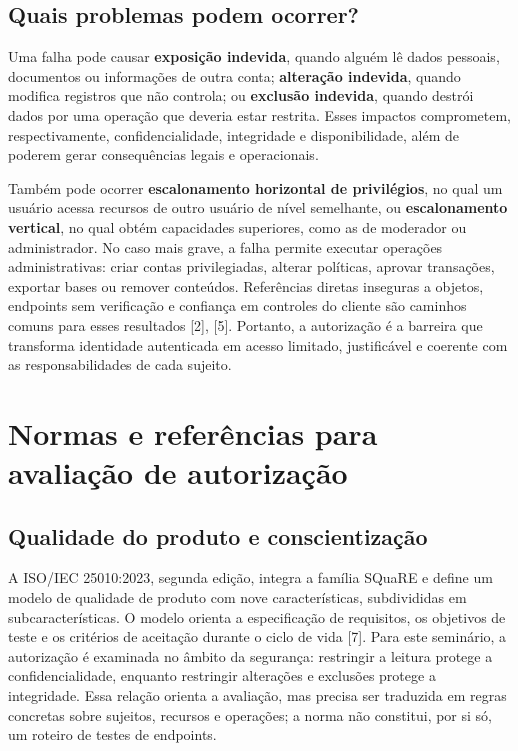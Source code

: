 \subsection{Quais problemas podem
ocorrer?}\label{quais-problemas-podem-ocorrer}

Uma falha pode causar \textbf{exposição indevida}, quando alguém lê
dados pessoais, documentos ou informações de outra conta;
\textbf{alteração indevida}, quando modifica registros que não controla;
ou \textbf{exclusão indevida}, quando destrói dados por uma operação que
deveria estar restrita. Esses impactos comprometem, respectivamente,
confidencialidade, integridade e disponibilidade, além de poderem gerar
consequências legais e operacionais.

Também pode ocorrer \textbf{escalonamento horizontal de privilégios}, no
qual um usuário acessa recursos de outro usuário de nível semelhante, ou
\textbf{escalonamento vertical}, no qual obtém capacidades superiores,
como as de moderador ou administrador. No caso mais grave, a falha
permite executar operações administrativas: criar contas privilegiadas,
alterar políticas, aprovar transações, exportar bases ou remover
conteúdos. Referências diretas inseguras a objetos, endpoints sem
verificação e confiança em controles do cliente são caminhos comuns para
esses resultados {[}2{]}, {[}5{]}. Portanto, a autorização é a barreira
que transforma identidade autenticada em acesso limitado, justificável e
coerente com as responsabilidades de cada sujeito.

\section{Normas e referências para avaliação de
autorização}\label{normas-e-referuxeancias-para-avaliauxe7uxe3o-de-autorizauxe7uxe3o}

\subsection{Qualidade do produto e
conscientização}\label{qualidade-do-produto-e-conscientizauxe7uxe3o}

A ISO/\allowbreak{}IEC 25010:2023, segunda edição, integra a família SQuaRE e define
um modelo de qualidade de produto com nove características, subdivididas
em subcaracterísticas. O modelo orienta a especificação de requisitos,
os objetivos de teste e os critérios de aceitação durante o ciclo de
vida {[}7{]}. Para este seminário, a autorização é examinada no âmbito
da segurança: restringir a leitura protege a confidencialidade, enquanto
restringir alterações e exclusões protege a integridade. Essa relação
orienta a avaliação, mas precisa ser traduzida em regras concretas sobre
sujeitos, recursos e operações; a norma não constitui, por si só, um
roteiro de testes de endpoints.

